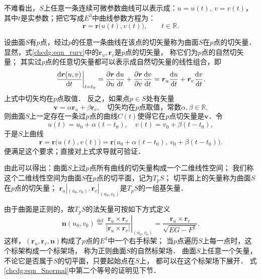 
不难看出，$S$上任意一条连续可微参数曲线可以表示成：$u=u(t),\ v=v(t)$，
其中$t$是实参数；把它写成$E^3$中曲线参数方程为：
\begin{equation}
    \boldsymbol{r}= \boldsymbol{r}\bigl( u(t), v(t) \bigr),\qquad t\in \mathbb{R} .
\end{equation}

设曲面$S$有$p$点，经过$p$的任意一条曲线在该点的切矢量称为曲面$S$在$p$点的{\heiti 切矢量}．
显然，式\eqref{chcdg:eqn_rurv}中的$\boldsymbol{r}_u,\boldsymbol{r}_v$是$p$点的切矢量，
称它们为$p$点的{\heiti 自然切矢量}；
其实过$p$点的任意切矢量都可以表示成自然切矢量的线性组合，即
\begin{align}
    \left. \frac{{\rm d}\boldsymbol{r}(u,v)}{{\rm d} t} \right|_{t=t_0}
    = \frac{\partial \boldsymbol{r}}{\partial u} \frac{{\rm d}u }{{\rm d} t}
     +\frac{\partial \boldsymbol{r}}{\partial v} \frac{{\rm d}v }{{\rm d} t}
     =\boldsymbol{r}_u \frac{{\rm d}u }{{\rm d} t} + \boldsymbol{r}_v \frac{{\rm d}v }{{\rm d} t}.
\end{align}
上式中切矢均在$p$点取值．
反之，如果点$p\in S$处有矢量
\begin{equation}
    \boldsymbol{v}= \alpha \boldsymbol{r}_u + \beta \boldsymbol{r}_v,\quad
    \text{切矢均在$p$点取值，常数}\alpha,\beta \in \mathbb{R} .
\end{equation}
则曲面$S$上一定存在一条过$p$点的曲线$C(t)$使得它在$p$点切矢量是$\boldsymbol{v}$．令
\begin{equation}
    u(t)=u_0 + \alpha (t-t_0),\quad v(t)=v_0 + \beta (t-t_0) ,
\end{equation}
于是$S$上曲线
\begin{equation}
    \boldsymbol{r}=\boldsymbol{r}\bigl( u(t), v(t) \bigr)
    =\boldsymbol{r}\bigl(u_0 + \alpha (t-t_0),\ v_0 + \beta (t-t_0) \bigr) .
\end{equation}
便满足这个要求；直接对上式求导就可验证．

由此可以得出：曲面$S$上过$p$点所有曲线的切矢量构成一个二维线性空间；
我们称这个二维线性空间为曲面$S$在$p$点的{\heiti 切平面}，记为$T_pS$；
切平面上的矢量称为曲面$S$在$p$点的{\heiti 切矢量}；
$\boldsymbol{r}_u|_{(u_0,v_0)},\boldsymbol{r}_v|_{(u_0,v_0)}$是$T_pS$的一组基矢量．

由于曲面是正则的，故$T_pS$的法矢量可按如下方式定义
\begin{equation}\label{chcdg:eqn_Snormal}
    \boldsymbol{n}(u_0,v_0) \overset{\mathrm {def}}{=} \left. \frac{\boldsymbol{r}_u \times \boldsymbol{r}_v}
    {|\boldsymbol{r}_u \times \boldsymbol{r}_v|} \right |_ {(u_0,v_0)}
    = \frac{\boldsymbol{r}_u \times \boldsymbol{r}_v} {\sqrt{EG-F^2}}.
\end{equation}
这样，$(\boldsymbol{r}_u , \boldsymbol{r}_v, \boldsymbol{n})$构成了$p$点的$E^3$中一个右手标架；
当$p$点遍历$S$上每一点时，这个标架构成一个标架场，
称为正则曲面$S$的{\heiti 自然标架场}．
曲面$S$上任意一个矢量，不论它是否属于$S$的切平面，只要起始点在$S$上，
都可以在这个标架场下展开．
式\eqref{chcdg:eqn_Snormal}中第二个等号的证明见下节．



